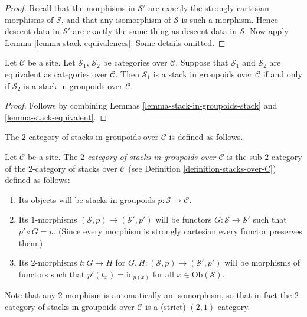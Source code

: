 \begin{proof}
Recall that the morphisms in $\mathcal{S}'$ are exactly the
strongly cartesian morphisms of $\mathcal{S}$, and that any isomorphism of
$\mathcal{S}$ is such a morphism. Hence descent data in $\mathcal{S}'$
are exactly the same thing as descent data in $\mathcal{S}$. Now apply
Lemma \ref{lemma-stack-equivalences}. Some details omitted.
\end{proof}

\begin{lemma}
\label{lemma-stack-in-groupoids-equivalent}
Let $\mathcal{C}$ be a site.
Let $\mathcal{S}_1$, $\mathcal{S}_2$ be categories over $\mathcal{C}$.
Suppose that $\mathcal{S}_1$ and $\mathcal{S}_2$ are equivalent
as categories over $\mathcal{C}$.
Then $\mathcal{S}_1$ is a stack in groupoids over $\mathcal{C}$ if and only if
$\mathcal{S}_2$ is a stack in groupoids over $\mathcal{C}$.
\end{lemma}

\begin{proof}
Follows by combining
Lemmas \ref{lemma-stack-in-groupoids-stack} and \ref{lemma-stack-equivalent}.
\end{proof}

\noindent
The $2$-category of stacks in groupoids over $\mathcal{C}$
is defined as follows.

\begin{definition}
\label{definition-stacks-in-groupoids-over-C}
Let $\mathcal{C}$ be a site.
The {\it $2$-category of stacks in groupoids over $\mathcal{C}$}
is the sub $2$-category of the $2$-category of stacks
over $\mathcal{C}$ (see Definition \ref{definition-stacks-over-C})
defined as follows:
\begin{enumerate}
\item Its objects will be stacks in groupoids
$p : \mathcal{S} \to \mathcal{C}$.
\item Its $1$-morphisms $(\mathcal{S}, p) \to (\mathcal{S}', p')$
will be functors $G : \mathcal{S} \to \mathcal{S}'$ such that
$p' \circ G = p$. (Since every morphism is strongly cartesian
every functor preserves them.)
\item Its $2$-morphisms $t : G \to H$ for
$G, H : (\mathcal{S}, p) \to (\mathcal{S}', p')$
will be morphisms of functors
such that $p'(t_x) = \text{id}_{p(x)}$
for all $x \in \text{Ob}(\mathcal{S})$.
\end{enumerate}
\end{definition}

\noindent
Note that any $2$-morphism is automatically an isomorphism, so
that in fact the $2$-category of stacks in groupoids over $\mathcal{C}$
is a (strict) $(2,1)$-category.

